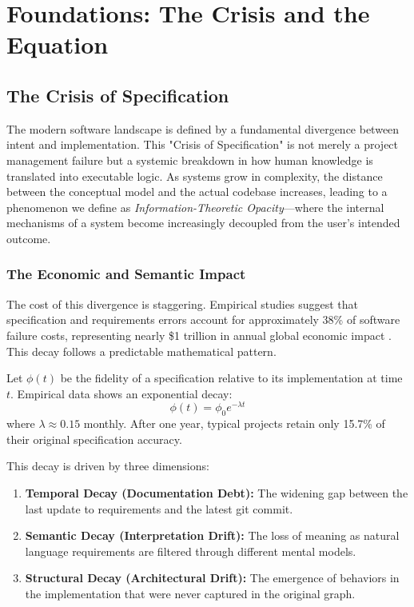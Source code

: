 \chapter{Foundations: The Crisis and the Equation}

\section{The Crisis of Specification}

The modern software landscape is defined by a fundamental divergence between intent and implementation. This "Crisis of Specification" is not merely a project management failure but a systemic breakdown in how human knowledge is translated into executable logic. As systems grow in complexity, the distance between the conceptual model and the actual codebase increases, leading to a phenomenon we define as \textit{Information-Theoretic Opacity}---where the internal mechanisms of a system become increasingly decoupled from the user's intended outcome.

\subsection{The Economic and Semantic Impact}

The cost of this divergence is staggering. Empirical studies suggest that specification and requirements errors account for approximately 38\% of software failure costs, representing nearly \$1 trillion in annual global economic impact \cite{cisq2022}. This decay follows a predictable mathematical pattern.

\begin{definition}
    Let $\phi(t)$ be the fidelity of a specification relative to its implementation at time $t$. Empirical data shows an exponential decay:
    \begin{equation}
        \phi(t) = \phi_0 e^{-\lambda t}
    \end{equation}
    where $\lambda \approx 0.15$ monthly. After one year, typical projects retain only 15.7\% of their original specification accuracy.
\end{definition}

This decay is driven by three dimensions:
\begin{enumerate}
    \item \textbf{Temporal Decay (Documentation Debt):} The widening gap between the last update to requirements and the latest git commit.
    \item \textbf{Semantic Decay (Interpretation Drift):} The loss of meaning as natural language requirements are filtered through different mental models.
    \item \textbf{Structural Decay (Architectural Drift):} The emergence of behaviors in the implementation that were never captured in the original graph.
\end{enumerate}

